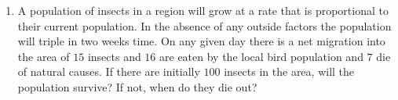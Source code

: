 \documentclass[11pt]{article}
\begin{document}
\begin{enumerate}
\item
A population of insects in a region will grow at a rate that is proportional to their current population. In the absence of any outside factors the population will triple in two weeks time. On any given day there is a net migration into the area of \(15\) insects and \(16\) are eaten by the local bird population and \(7\) die of natural causes. If there are initially \(100\) insects in the area, will the population survive? If not, when do they die out?






































\end{enumerate}
\end{document}
